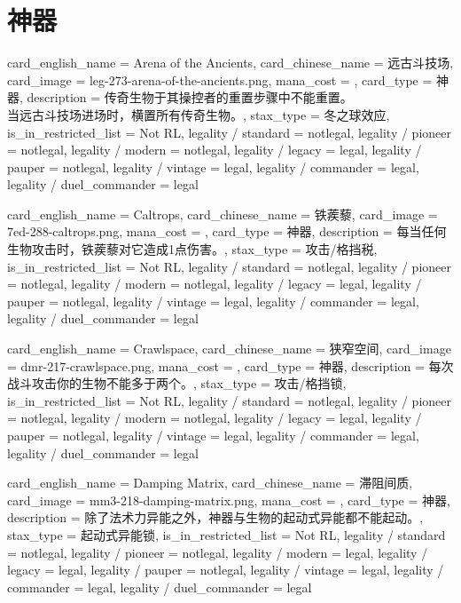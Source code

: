 \documentclass[lang = cn, color = black, 10pt]{AllThatStax}
\begin{document}
\section{神器}

\card
{
	card_english_name = {Arena of the Ancients},
	card_chinese_name = {远古斗技场},
	card_image = leg-273-arena-of-the-ancients.png,
	mana_cost = ,
	card_type = 神器,
	description = {传奇生物于其操控者的重置步骤中不能重置。\\
当远古斗技场进场时，横置所有传奇生物。},
	stax_type = 冬之球效应,
	is_in_restricted_list = Not RL,
	legality / standard = notlegal,
	legality / pioneer = notlegal,
	legality / modern = notlegal,
	legality / legacy = legal,
	legality / pauper = notlegal,
	legality / vintage = legal,
	legality / commander = legal,
	legality / duel_commander = legal
}

\card
{
	card_english_name = {Caltrops},
	card_chinese_name = {铁蒺藜},
	card_image = 7ed-288-caltrops.png,
	mana_cost = ,
	card_type = 神器,
	description = {每当任何生物攻击时，铁蒺藜对它造成1点伤害。},
	stax_type = 攻击/格挡税,
	is_in_restricted_list = Not RL,
	legality / standard = notlegal,
	legality / pioneer = notlegal,
	legality / modern = notlegal,
	legality / legacy = legal,
	legality / pauper = notlegal,
	legality / vintage = legal,
	legality / commander = legal,
	legality / duel_commander = legal
}

\card
{
	card_english_name = {Crawlspace},
	card_chinese_name = {狭窄空间},
	card_image = dmr-217-crawlspace.png,
	mana_cost = ,
	card_type = 神器,
	description = {每次战斗攻击你的生物不能多于两个。},
	stax_type = 攻击/格挡锁,
	is_in_restricted_list = Not RL,
	legality / standard = notlegal,
	legality / pioneer = notlegal,
	legality / modern = notlegal,
	legality / legacy = legal,
	legality / pauper = notlegal,
	legality / vintage = legal,
	legality / commander = legal,
	legality / duel_commander = legal
}

\card
{
	card_english_name = {Damping Matrix},
	card_chinese_name = {滞阻间质},
	card_image = mm3-218-damping-matrix.png,
	mana_cost = ,
	card_type = 神器,
	description = {除了法术力异能之外，神器与生物的起动式异能都不能起动。},
	stax_type = 起动式异能锁,
	is_in_restricted_list = Not RL,
	legality / standard = notlegal,
	legality / pioneer = notlegal,
	legality / modern = legal,
	legality / legacy = legal,
	legality / pauper = notlegal,
	legality / vintage = legal,
	legality / commander = legal,
	legality / duel_commander = legal
}
\end{document}
